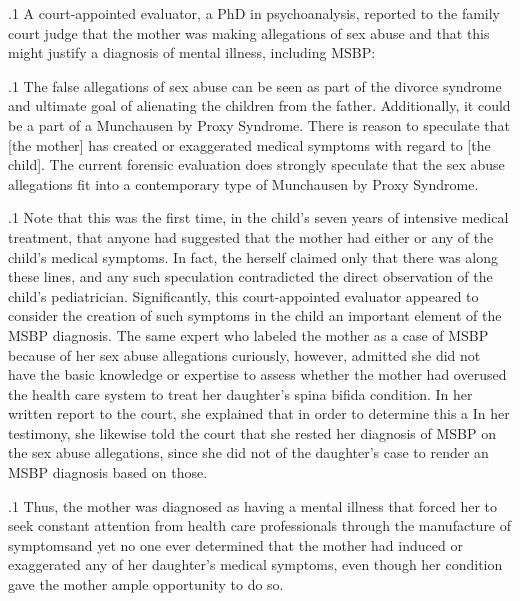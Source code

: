 \documentclass[11pt, twoside]{article}
\begin{document}
{\p.1{%
A court-appointed evaluator, a PhD in psychoanalysis, reported to
the family court judge that the mother was making  allegations
of sex abuse and that this might justify a diagnosis of mental illness,
including MSBP:
}%

\p.1{%
The false allegations of sex abuse can be seen as part of the divorce
syndrome and ultimate goal of alienating the children from the father. Additionally, it could be a part of a Munchausen by Proxy
Syndrome. There is reason to speculate that [the mother] has created or exaggerated medical symptoms with regard to [the child].
The current forensic evaluation does strongly speculate that the sex
abuse allegations fit into a contemporary type of Munchausen by
Proxy Syndrome.
}%

\p.1{%
Note that this was the first time, in the child’s seven years of intensive
medical treatment, that anyone had suggested that the mother had either
 or  any of the child’s medical symptoms. In fact,
the  herself claimed only that there was 
along these lines, and any such speculation contradicted the direct observation of the child’s pediatrician. Significantly, this court-appointed
evaluator appeared to consider the creation of such symptoms in the
child an important element of the MSBP diagnosis.
The same expert who labeled the mother as a case of MSBP because
of her sex abuse allegations curiously, however, admitted she did not
have the basic knowledge or expertise to assess whether the mother had
overused the health care system to treat her daughter’s spina bifida condition. In her written report to the court, she explained that in order to determine
this a  In her
testimony, she likewise told the court that she rested her diagnosis of
MSBP on the sex abuse allegations, since she did not  of the daughter’s case to render an MSBP diagnosis
based on those.
}%

\p.1{%
Thus, the mother was diagnosed as having a mental illness that forced
her to seek constant attention from health care professionals through
the manufacture of symptoms\mdash{}and yet no one ever determined that the
mother had induced or exaggerated any of her daughter’s medical symptoms, even though her condition gave the mother ample opportunity to
do so.
}%

}
\end{document}
